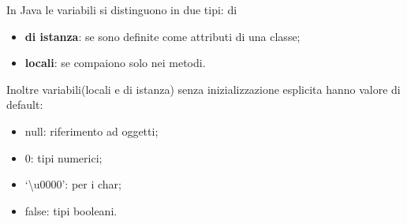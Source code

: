 \documentclass{subfile}
\begin{document}
    In Java le variabili si distinguono in due tipi: di
    \begin{itemize}
        \item \textbf{di istanza}: se sono definite come attributi di una classe;
        \item \textbf{locali}: se compaiono solo nei metodi.
    \end{itemize} 
  Inoltre variabili(locali e di istanza) senza inizializzazione esplicita hanno valore di default:
  \begin{itemize}
   \item null: riferimento ad oggetti;
   \item 0: tipi numerici;
   \item `\textbackslash u0000': per i char;
   \item false: tipi booleani.
  \end{itemize} 
\end{document}
